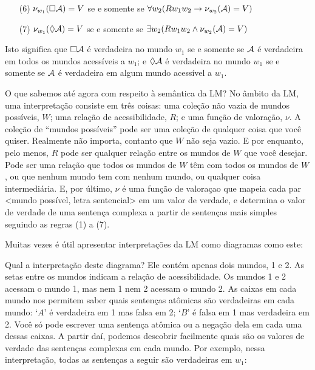 \begin{itemize}
	\item[(6)]$\nu_{w_1}(\Box \mathcal{A})=V$ se e somente se  $\forall w_2 (Rw_1w_2\rightarrow \nu_{w_2}(\mathcal{A})=V)$
	\item[(7)]$\nu_{w_1}(\Diamond \mathcal{A})=V$ se e somente se  $\exists w_2 (Rw_1w_2\wedge \nu_{w_2}(\mathcal{A})=V)$
\end{itemize}
Isto significa que $\Box\mathcal{A}$ é verdadeira no mundo  $w_1$ se e somente se $\mathcal{A}$ é verdadeira em todos os mundos acessíveis a  $w_1$; e $\Diamond\mathcal{A}$ é verdadeira no mundo  $w_1$ se e somente se $\mathcal{A}$ é verdadeira em algum mundo acessível a  $w_1$.

O que sabemos até agora com respeito à semântica da LM?  No âmbito da LM, uma interpretação consiste em três coisas: uma coleção não vazia de mundos possíveis, $W$; uma relação de acessibilidade, $R$; e uma função de valoração, $\nu$. A coleção de ``mundos possíveis'' pode  ser uma coleção de qualquer coisa que você quiser. Realmente não importa, contanto que $W$ não seja vazio. 
E por enquanto, pelo menos, $R$ pode ser qualquer relação entre os mundos de $W$ que você desejar. Pode ser uma relação que todos os mundos de $W$ têm com todos os mundos de $W$, ou que nenhum mundo tem com nenhum mundo, ou qualquer coisa intermediária. 
E, por último, $\nu$ é uma função de valoraçao que mapeia cada par <mundo possível, letra sentencial> em um valor de verdade, e determina o valor de verdade de uma sentença complexa a partir de sentenças mais simples seguindo as regras (1) a (7).

 Muitas vezes é útil apresentar interpretações da LM como diagramas como este:
\begin{center}
\end{center}
Qual a interpretação deste diagrama? Ele contém apenas dois mundos, 1 e 2. As setas entre os mundos indicam a relação de acessibilidade. Os mundos 1 e 2 acessam o mundo 1, mas nem 1 nem 2 acessam o mundo 2. As caixas em cada mundo nos permitem saber quais sentenças atômicas são verdadeiras em cada mundo: `$A$' é verdadeira em 1 mas  falsa em 2; `$B$' é falsa em 1 mas verdadeira em 2. Você só pode escrever uma sentença atômica ou a negação dela  em cada uma dessas caixas. A partir daí, podemos descobrir facilmente quais são os valores de verdade das sentenças complexas em cada mundo. Por exemplo, nessa interpretação, todas as sentenças a seguir são verdadeiras em $w_1$: 
 
